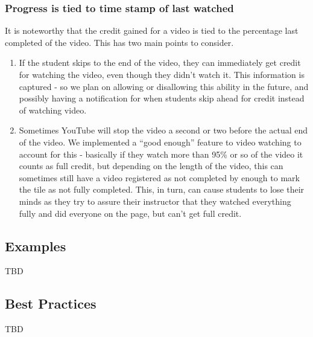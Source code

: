 \documentclass{ximera}
\begin{document}
        \subsubsection*{Progress is tied to time stamp of last watched}
            It is noteworthy that the credit gained for a video is tied to the percentage last completed of the video. This has two main points to consider.
            \begin{enumerate}
                \item If the student skips to the end of the video, they can immediately get credit for watching the video, even though they didn't watch it. This information is captured - so we plan on allowing or disallowing this ability in the future, and possibly having a notification for when students skip ahead for credit instead of watching video.
                \item Sometimes YouTube will stop the video a second or two before the actual end of the video. We implemented a ``good enough'' feature to video watching to account for this - basically if they watch more than 95\% or so of the video it counts as full credit, but depending on the length of the video, this can sometimes still have a video registered as not completed by enough to mark the tile as not fully completed. This, in turn, can cause students to lose their minds as they try to assure their instructor that they watched everything fully and did everyone on the page, but can't get full credit.
            
            \end{enumerate}

    \subsection*{Examples}
    
        TBD
        
    \subsection*{Best Practices}
    
        TBD
        
    
\end{document}
